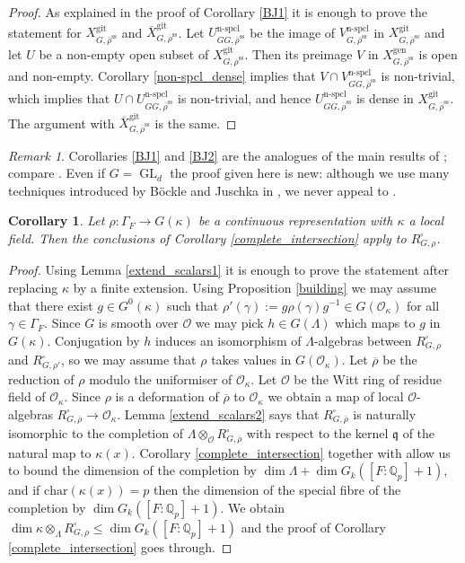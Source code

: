 \documentclass{amsart}
\newtheorem{cor}[prop]{Corollary}
\theoremstyle{definition}
\theoremstyle{remark}
\newtheorem{remar}[prop]{Remark}
\DeclareMathOperator{\GL}{GL}
\newcommand{\Qp}{\mathbb {Q}_p}
\newcommand{\OO}{\mathcal O}
\newcommand{\qq}{\mathfrak{q}}
\newcommand{\rhobar}{\overline{\rho}}
\newcommand{\gen}{\mathrm{gen}}
\newcommand{\gps}{\mathrm{git}}
\newcommand{\Xbar}{\overline{X}}
\DeclareMathOperator{\nspcl}{n-spcl}
\newcommand{\chara}{\mathrm{char}}
\newcommand{\rhobarss}{\rhobar^{\mathrm{ss}}}
\begin{document}
\begin{proof} As explained in the proof of Corollary \ref{BJ1} it is enough to prove the 
statement for $X^{\gps}_{G, \rhobarss}$ and $\Xbar^{\gps}_{G, \rhobarss}$. 
Let $U^{\nspcl}_{GG, \rhobarss}$ be the image of $V^{\nspcl}_{G, \rhobarss}$ in $X^{\gps}_{G, \rhobarss}$ and let $U$ be a non-empty open subset of $X^{\gps}_{G, \rhobarss}$. Then its preimage 
$V$ in $X^{\gen}_{G, \rhobarss}$ is open and non-empty. Corollary \ref{non-spcl_dense} implies 
that $V\cap V^{\nspcl}_{GG, \rhobarss}$ is non-trivial, which implies that 
$U\cap U^{\nspcl}_{GG, \rhobarss}$ is non-trivial, and hence $U^{\nspcl}_{GG, \rhobarss}$
is dense in $X^{\gps}_{G, \rhobarss}$. The argument with $\Xbar^{\gps}_{G, \rhobarss}$ is the same.
\end{proof} 

\begin{remar} Corollaries \ref{BJ1} and \ref{BJ2} are the analogues of the main results 
of \cite{BJ_new}; compare \cite[Theorem 5.5.1]{BJ_new}. Even if $G=\GL_d$ the proof given here is new: although we use 
many techniques introduced by B\"ockle and Juschka in \cite{BJ_new}, we never appeal to 
\cite[Section 5]{BJ_new}.
\end{remar}

\begin{cor} Let $\rho: \Gamma_F \rightarrow G(\kappa)$ be a continuous representation 
with $\kappa$ a local field. Then the conclusions of Corollary \ref{complete_intersection}
apply to $R^{\square}_{G, \rho}$. 
\end{cor} 
\begin{proof} Using Lemma \ref{extend_scalars1} it is enough to prove the statement 
after replacing $\kappa$ by a finite extension. Using Proposition \ref{building} we may assume 
that there exist $g\in G^0(\kappa)$ such that $\rho'(\gamma):=g \rho(\gamma)g^{-1} \in G(\OO_{\kappa})$ 
for all $\gamma\in \Gamma_F$. Since $G$ is smooth over $\OO$ we may pick $h\in G(\Lambda)$ which maps 
to $g$ in $G(\kappa)$. Conjugation by $h$ induces an isomorphism of $\Lambda$-algebras between 
$R^{\square}_{G, \rho}$ and $R^{\square}_{G, \rho'}$, so we may assume that $\rho$ takes values in 
$G(\OO_{\kappa})$. Let $\rhobar$ be the reduction of $\rho$ modulo the uniformiser 
of $\OO_{\kappa}$. Let $\OO$ be the Witt ring of residue field of $\OO_{\kappa}$. 
Since $\rho$ is a deformation of $\rhobar$ to $\OO_{\kappa}$ we obtain 
a map of local $\OO$-algebras $R^{\square}_{G, \rhobar} \rightarrow \OO_{\kappa}$. 
Lemma \ref{extend_scalars2} says that $R^{\square}_{G, \rhobar}$ is naturally 
isomorphic to the completion of $\Lambda\otimes_{\OO} R^{\square}_{G, \rhobar}$ 
with respect to the kernel $\qq$ of the natural map to $\kappa(x)$.
Corollary \ref{complete_intersection} together with 
\cite[Lemmas 3.36, 3.37]{BIP_new} allow us to bound the 
dimension of the completion by $\dim \Lambda +\dim G_k([F:\Qp]+1)$, 
and if $\chara(\kappa(x))=p$ then the dimension of the
special fibre of the completion by $\dim G_k([F:\Qp]+1)$. We obtain 
$ \dim \kappa\otimes_{\Lambda} R^{\square}_{G, \rho}\le \dim G_k([F:\Qp]+1)$
and the proof of Corollary \ref{complete_intersection} goes through. 
\end{proof}
\end{document}
